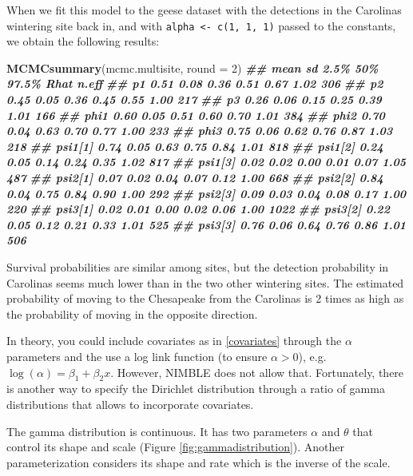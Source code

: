 \documentclass[
  12pt,
]{krantz}
\newenvironment{Shaded}{\begin{snugshade}}{\end{snugshade}}
\newcommand{\AttributeTok}[1]{\textcolor[rgb]{0.13,0.29,0.53}{#1}}
\newcommand{\DecValTok}[1]{\textcolor[rgb]{0.00,0.00,0.81}{#1}}
\newcommand{\DocumentationTok}[1]{\textcolor[rgb]{0.56,0.35,0.01}{\textbf{\textit{#1}}}}
\newcommand{\FunctionTok}[1]{\textcolor[rgb]{0.13,0.29,0.53}{\textbf{#1}}}
\newcommand{\NormalTok}[1]{#1}
\begin{document}
When we fit this model to the geese dataset with the detections in the Carolinas wintering site back in, and with \texttt{alpha\ \textless{}-\ c(1,\ 1,\ 1)} passed to the constants, we obtain the following results:

\begin{Shaded}
\begin{Highlighting}[]
\FunctionTok{MCMCsummary}\NormalTok{(mcmc.multisite, }\AttributeTok{round =} \DecValTok{2}\NormalTok{)}
\DocumentationTok{\#\#         mean   sd 2.5\%  50\% 97.5\% Rhat n.eff}
\DocumentationTok{\#\# p1      0.51 0.08 0.36 0.51  0.67 1.02   306}
\DocumentationTok{\#\# p2      0.45 0.05 0.36 0.45  0.55 1.00   217}
\DocumentationTok{\#\# p3      0.26 0.06 0.15 0.25  0.39 1.01   166}
\DocumentationTok{\#\# phi1    0.60 0.05 0.51 0.60  0.70 1.01   384}
\DocumentationTok{\#\# phi2    0.70 0.04 0.63 0.70  0.77 1.00   233}
\DocumentationTok{\#\# phi3    0.75 0.06 0.62 0.76  0.87 1.03   218}
\DocumentationTok{\#\# psi1[1] 0.74 0.05 0.63 0.75  0.84 1.01   818}
\DocumentationTok{\#\# psi1[2] 0.24 0.05 0.14 0.24  0.35 1.02   817}
\DocumentationTok{\#\# psi1[3] 0.02 0.02 0.00 0.01  0.07 1.05   487}
\DocumentationTok{\#\# psi2[1] 0.07 0.02 0.04 0.07  0.12 1.00   668}
\DocumentationTok{\#\# psi2[2] 0.84 0.04 0.75 0.84  0.90 1.00   292}
\DocumentationTok{\#\# psi2[3] 0.09 0.03 0.04 0.08  0.17 1.00   220}
\DocumentationTok{\#\# psi3[1] 0.02 0.01 0.00 0.02  0.06 1.00  1022}
\DocumentationTok{\#\# psi3[2] 0.22 0.05 0.12 0.21  0.33 1.01   525}
\DocumentationTok{\#\# psi3[3] 0.76 0.06 0.64 0.76  0.86 1.01   506}
\end{Highlighting}
\end{Shaded}

Survival probabilities are similar among sites, but the detection probability in Carolinas seems much lower than in the two other wintering sites. The estimated probability of moving to the Chesapeake from the Carolinas is 2 times as high as the probability of moving in the opposite direction.

In theory, you could include covariates as in \ref{covariates} through the \(\alpha\) parameters and the use a log link function (to ensure \(\alpha > 0\)), e.g.~\(\log(\alpha) = \beta_1 + \beta_2 x\). However, NIMBLE does not allow that. Fortunately, there is another way to specify the Dirichlet distribution through a ratio of gamma distributions that allows to incorporate covariates.

The gamma distribution is continuous. It has two parameters \(\alpha\) and \(\theta\) that control its shape and scale (Figure \ref{fig:gammadistribution}). Another parameterization considers its shape and rate which is the inverse of the scale.
\end{document}

